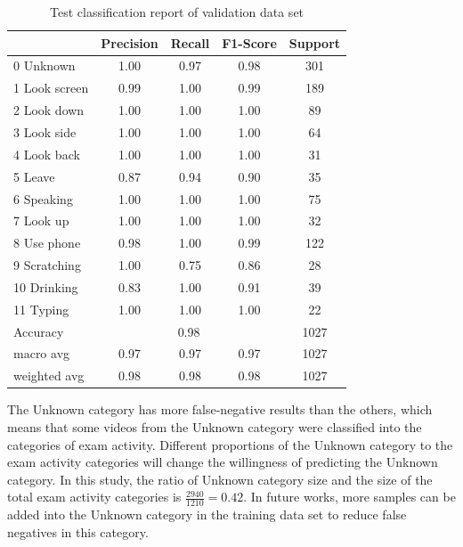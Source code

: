 \begin{table}[!htbp]
\centering
\begin{tabular}{|l|c|c|c|c|}
\hline
              & Precision & Recall & F1-Score & Support \\ \hline
0 Unknown     & 1.00      & 0.97   & 0.98     & 301     \\ \hline
1 Look screen & 0.99      & 1.00   & 0.99     & 189     \\ \hline
2 Look down   & 1.00      & 1.00   & 1.00     & 89      \\ \hline
3 Look side   & 1.00      & 1.00   & 1.00     & 64      \\ \hline
4 Look back   & 1.00      & 1.00   & 1.00     & 31      \\ \hline
5 Leave       & 0.87      & 0.94   & 0.90     & 35      \\ \hline
6 Speaking    & 1.00      & 1.00   & 1.00     & 75      \\ \hline
7 Look up     & 1.00      & 1.00   & 1.00     & 32      \\ \hline
8 Use phone   & 0.98      & 1.00   & 0.99     & 122     \\ \hline
9 Scratching  & 1.00      & 0.75   & 0.86     & 28      \\ \hline
10 Drinking   & 0.83      & 1.00   & 0.91     & 39      \\ \hline
11 Typing     & 1.00      & 1.00   & 1.00     & 22      \\ \hline
Accuracy      & \multicolumn{3}{c|}{0.98}     & 1027    \\ \hline
macro avg     & 0.97      & 0.97   & 0.97     & 1027    \\ \hline
weighted avg  & 0.98      & 0.98   & 0.98     & 1027    \\ \hline
\end{tabular}
\caption{Test classification report of validation data set}
\label{tab:Test classification report}
\end{table}

The Unknown category has more false-negative results than the others, which means that some videos from the Unknown category were classified into the categories of exam activity.
Different proportions of the Unknown category to the exam activity categories will change the willingness of predicting the Unknown category.
In this study, the ratio of Unknown category size and the size of the total exam activity categories is $\frac{2940}{1210} = 0.42$.
In future works, more samples can be added into the Unknown category in the training data set to reduce false negatives in this category.
